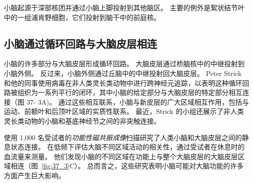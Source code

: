 小脑起源于深部核团并通过小脑上脚投射到其他脑区。
主要的例外是絮状结节叶中的一组浦肯野细胞，它们投射到脑干中的前庭核。



\subsection{小脑通过循环回路与大脑皮层相连}

小脑的许多部分与大脑皮层形成循环回路。
大脑皮层通过桥脑核中的中继投射到小脑外侧。
反过来，小脑外侧通过丘脑中的中继投射回大脑皮层。
Peter Strick 和他的同事使用病毒在非人类灵长类动物中进行跨神经元追踪，以表明这种循环回路被组织为一系列平行的闭环，其中小脑的给定部分与大脑皮层的特定部分相互连接（图 37- 3A)。
通过这些相互联系，小脑与新皮层的广大区域相互作用，包括与运动、前额叶和后顶叶区域的实质性联系。
最近，Strick 的小组还展示了非人类灵长类动物的小脑和基底神经节之间的非突触连接。


使用 1,000 名受试者的\textit{功能性磁共振成像}扫描研究了人类小脑和大脑皮层之间的静息状态连接。
在低频下评估大脑不同区域活动的相关性，通过受试者在休息时的血流量来测量。
他们发现小脑的不同区域在功能上与整个大脑皮层的大脑皮层区域相连（图~\ref{fig:37_3}C）。
总而言之，这些研究表明小脑可能对大脑功能的许多方面产生巨大影响。



